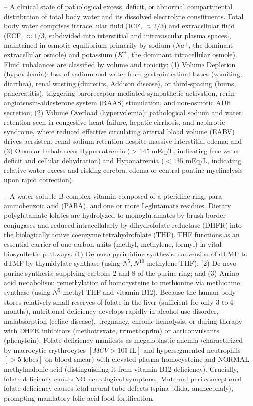 -- A clinical state of pathological excess, deficit, or abnormal compartmental distribution of total body water and its dissolved electrolyte constituents. Total body water comprises intracellular fluid (ICF, $\approx 2/3$) and extracellular fluid (ECF, $\approx 1/3$, subdivided into interstitial and intravascular plasma spaces), maintained in osmotic equilibrium primarily by sodium ($Na^+$, the dominant extracellular osmole) and potassium ($K^+$, the dominant intracellular osmole). Fluid imbalances are classified by volume and tonicity: (1) Volume Depletion (hypovolemia): loss of sodium and water from gastrointestinal losses (vomiting, diarrhea), renal wasting (diuretics, Addison disease), or third-spacing (burns, pancreatitis), triggering baroreceptor-mediated sympathetic activation, renin-angiotensin-aldosterone system (RAAS) stimulation, and non-osmotic ADH secretion; (2) Volume Overload (hypervolemia): pathological sodium and water retention seen in congestive heart failure, hepatic cirrhosis, and nephrotic syndrome, where reduced effective circulating arterial blood volume (EABV) drives persistent renal sodium retention despite massive interstitial edema; and (3) Osmolar Imbalances: Hypernatremia ($>145$ mEq/L, indicating free water deficit and cellular dehydration) and Hyponatremia ($<135$ mEq/L, indicating relative water excess and risking cerebral edema or central pontine myelinolysis upon rapid correction).

-- A water-soluble B-complex vitamin composed of a pteridine ring, para-aminobenzoic acid (PABA), and one or more L-glutamate residues. Dietary polyglutamate folates are hydrolyzed to monoglutamates by brush-border conjugases and reduced intracellularly by dihydrofolate reductase (DHFR) into the biologically active coenzyme tetrahydrofolate (THF). THF functions as an essential carrier of one-carbon units (methyl, methylene, formyl) in vital biosynthetic pathways: (1) De novo pyrimidine synthesis: conversion of dUMP to dTMP by thymidylate synthase (using $N^5,N^{10}$-methylene-THF); (2) De novo purine synthesis: supplying carbons 2 and 8 of the purine ring; and (3) Amino acid metabolism: remethylation of homocysteine to methionine via methionine synthase (using $N^5$-methyl-THF and vitamin B12). Because the human body stores relatively small reserves of folate in the liver (sufficient for only 3 to 4 months), nutritional deficiency develops rapidly in alcohol use disorder, malabsorption (celiac disease), pregnancy, chronic hemolysis, or during therapy with DHFR inhibitors (methotrexate, trimethoprim) or anticonvulsants (phenytoin). Folate deficiency manifests as megaloblastic anemia (characterized by macrocytic erythrocytes $[MCV > 100\text{ fL}]$ and hypersegmented neutrophils $[>5\text{ lobes}]$ on blood smear) with elevated plasma homocysteine and NORMAL methylmalonic acid (distinguishing it from vitamin B12 deficiency). Crucially, folate deficiency causes NO neurological symptoms. Maternal peri-conceptional folate deficiency causes fetal neural tube defects (spina bifida, anencephaly), prompting mandatory folic acid food fortification.

